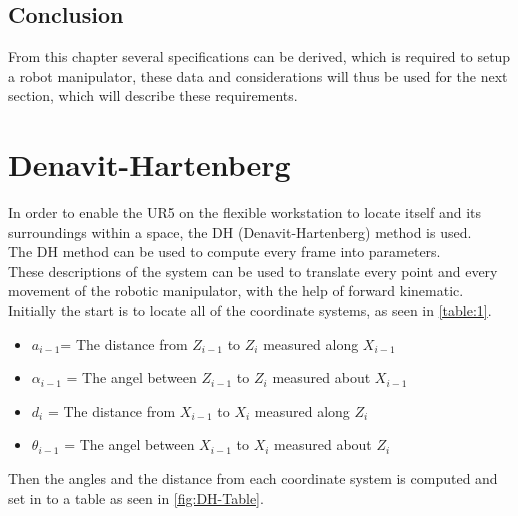 \subsection{Conclusion}

From this chapter several specifications can be derived, which is required to setup a robot manipulator, these data and considerations will thus be used for the next section, which will describe these requirements.


\section{Denavit-Hartenberg}

In order to enable the UR5 on the flexible workstation to locate itself and its surroundings within a space, the DH (Denavit-Hartenberg) method is used.\\ 
The DH method can be used to compute every frame into parameters.\\
These descriptions of the system can be used to translate every point and every movement of the robotic manipulator, with the help of forward kinematic.\\
Initially the start is to locate all of the coordinate systems, as seen in \ref{table:1}.\\ 


\begin{itemize}
    \item ${a_{i-1}}$= The distance from ${Z_{i-1}}$ to ${Z_{i}}$ measured along ${X_{i-1}}$
    \item ${\alpha_{i-1}}$ = The angel between ${Z_{i-1}}$ to ${Z_{i}}$ measured about ${X_{i-1}}$
    \item ${d_{i}}$ = The distance from ${X_{i-1}}$ to ${X_{i}}$ measured along ${Z_{i}}$
    \item ${\theta_{i-1}}$ = The angel between ${X_{i-1}}$ to ${X_{i}}$ measured about ${Z_{i}}$
\end{itemize}



Then the angles and the distance from each coordinate system is computed and set in to a table as seen in \ref{fig:DH-Table}.


